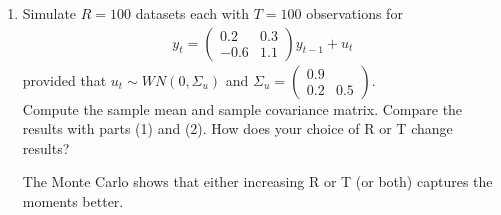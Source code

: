 \begin{enumerate}
    \item Simulate $R=100$ datasets each with $T=100$ observations for
          \begin{align*}
              y_t = \begin{pmatrix}0.2 &0.3 \\-0.6 & 1.1 \end{pmatrix} y_{t-1}  + u_t
          \end{align*}
          provided that $u_t \sim WN(0,\Sigma_u)$ and $\Sigma_u = \begin{pmatrix}0.9 &  \\ 0.2 & 0.5 \end{pmatrix}$. \\Compute the sample mean and sample covariance matrix. Compare the results with parts (1) and (2). How does your choice of R or T change results?

          \begin{solution}
              
              The Monte Carlo shows that either increasing R or T (or both) captures the moments better.
          \end{solution}
\end{enumerate}
